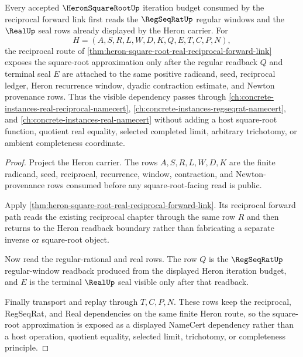 \begin{theorem}
\label{thm:heron-square-root-regseqrat-real-dependency-route}
Every accepted $\HeronSquareRootUp$ iteration budget consumed by the reciprocal forward link first reads the $\RegSeqRatUp$ regular windows and the $\RealUp$ seal rows already displayed by the Heron carrier. For
$$
H=(A,S,R,L,W,D,K,Q,E,T,C,P,N),
$$
the reciprocal route of \autoref{thm:heron-square-root-real-reciprocal-forward-link} exposes the square-root approximation only after the regular readback $Q$ and terminal seal $E$ are attached to the same positive radicand, seed, reciprocal ledger, Heron recurrence window, dyadic contraction estimate, and Newton provenance rows. Thus the visible dependency passes through \autoref{ch:concrete-instances-real-reciprocal-namecert}, \autoref{ch:concrete-instances-regseqrat-namecert}, and \autoref{ch:concrete-instances-real-namecert} without adding a host square-root function, quotient real equality, selected completed limit, arbitrary trichotomy, or ambient completeness coordinate.
\end{theorem}
\begin{proof}
Project the Heron carrier. The rows $A,S,R,L,W,D,K$ are the finite radicand, seed, reciprocal, recurrence, window, contraction, and Newton-provenance rows consumed before any square-root-facing read is public.

Apply \autoref{thm:heron-square-root-real-reciprocal-forward-link}. Its reciprocal forward path reads the existing reciprocal chapter through the same row $R$ and then returns to the Heron readback boundary rather than fabricating a separate inverse or square-root object.

Now read the regular-rational and real rows. The row $Q$ is the $\RegSeqRatUp$ regular-window readback produced from the displayed Heron iteration budget, and $E$ is the terminal $\RealUp$ seal visible only after that readback.

Finally transport and replay through $T,C,P,N$. These rows keep the reciprocal, RegSeqRat, and Real dependencies on the same finite Heron route, so the square-root approximation is exposed as a displayed NameCert dependency rather than a host operation, quotient equality, selected limit, trichotomy, or completeness principle.
\end{proof}

